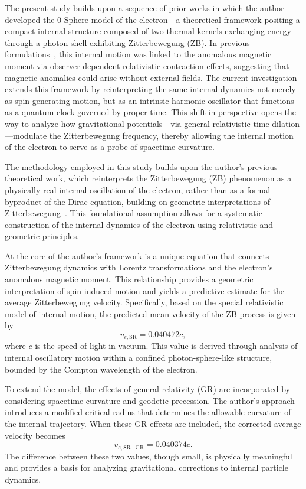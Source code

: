 \documentclass[%
 reprint,
 amsmath,amssymb,
 aps,
]{revtex4-1}
\numberwithin{equation}{section}%
\begin{document}
The present study builds upon a sequence of prior works in which the author developed the 0-Sphere model of the electron—a theoretical framework positing a compact internal structure composed of two thermal kernels exchanging energy through a photon shell exhibiting Zitterbewegung (ZB). In previous formulations~\cite{hanamura1811.0312, hanamura2411.0117, hanamura2006.0104, hanamura2309.0047, hanamura2501.0130}, this internal motion was linked to the anomalous magnetic moment via observer-dependent relativistic contraction effects, suggesting that magnetic anomalies could arise without external fields. The current investigation extends this framework by reinterpreting the same internal dynamics not merely as spin-generating motion, but as an intrinsic harmonic oscillator that functions as a quantum clock governed by proper time. This shift in perspective opens the way to analyze how gravitational potentials—via general relativistic time dilation—modulate the Zitterbewegung frequency, thereby allowing the internal motion of the electron to serve as a probe of spacetime curvature.

The methodology employed in this study builds upon the author's previous theoretical work, which reinterprets the Zitterbewegung (ZB) phenomenon as a physically real internal oscillation of the electron, rather than as a formal byproduct of the Dirac equation, building on geometric interpretations of Zitterbewegung~\cite{hestenes1990, barut1981}. This foundational assumption allows for a systematic construction of the internal dynamics of the electron using relativistic and geometric principles.

At the core of the author's framework is a unique equation that connects Zitterbewegung dynamics with Lorentz transformations and the electron's anomalous magnetic moment. This relationship provides a geometric interpretation of spin-induced motion and yields a predictive estimate for the average Zitterbewegung velocity. Specifically, based on the special relativistic model of internal motion, the predicted mean velocity of the ZB process is given by
\begin{equation}
v_{e,\text{SR}} = 0.040472c,
\end{equation}
where $c$ is the speed of light in vacuum. This value is derived through analysis of internal oscillatory motion within a confined photon-sphere-like structure, bounded by the Compton wavelength of the electron.

To extend the model, the effects of general relativity (GR) are incorporated by considering spacetime curvature and geodetic precession. The author's approach introduces a modified critical radius that determines the allowable curvature of the internal trajectory. When these GR effects are included, the corrected average velocity becomes
\begin{equation}
v_{e,\text{SR+GR}} = 0.040374c.
\end{equation}
The difference between these two values, though small, is physically meaningful and provides a basis for analyzing gravitational corrections to internal particle dynamics.
\end{document}
